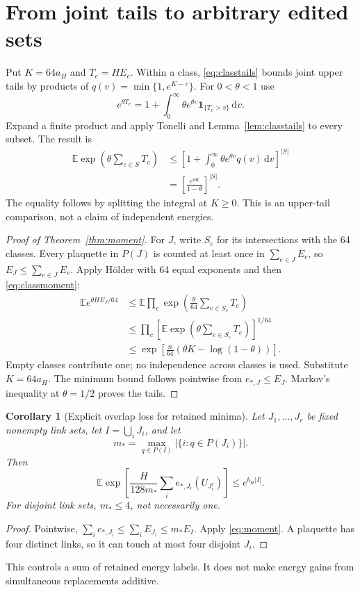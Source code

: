 \documentclass[11pt]{article}
\newtheorem{corollary}[theorem]{Corollary}
\theoremstyle{remark}
\newcommand{\one}{\mathbf 1}
\newcommand{\E}{\mathbb E}
\newcommand{\dd}{\,\mathrm d}
\begin{document}
\section{From joint tails to arbitrary edited sets}
Put $K=64a_H$ and $T_e=HE_e$. Within a class,
\eqref{eq:classtails} bounds joint upper tails by products of
$q(v)=\min\{1,e^{K-v}\}$. For $0<\theta<1$ use
\[
 e^{\theta T_e}=1+\int_0^\infty
                  \theta e^{\theta v}\one_{\{T_e>v\}}\dd v.
\]
Expand a finite product and apply Tonelli and
Lemma~\ref{lem:classtails} to every subset. The result is
\begin{align}
 \E\exp\!\left(\theta\sum_{e\in S}T_e\right)
 &\le\left[1+\int_0^\infty\theta e^{\theta v}q(v)\dd v\right]^{|S|}
   \nonumber\\
 &=\left[\frac{e^{\theta K}}{1-\theta}\right]^{|S|}.
 \label{eq:classmoment}
\end{align}
The equality follows by splitting the integral at $K\ge0$.
This is an upper-tail comparison, not a claim of independent energies.

\begin{proof}[Proof of Theorem~\ref{thm:moment}]
For $J$, write $S_c$ for its intersections with the 64 classes. Every
plaquette in $P(J)$ is counted at least once in $\sum_{e\in J}E_e$, so
$E_J\le\sum_{e\in J}E_e$. Apply H\"older with 64 equal exponents and
then \eqref{eq:classmoment}:
\begin{align*}
 \E e^{\theta HE_J/64}
 &\le \E\prod_c\exp\!\left(\frac\theta{64}
                                      \sum_{e\in S_c}T_e\right)\\
 &\le\prod_c\left[\E\exp\!\left(\theta
                                      \sum_{e\in S_c}T_e\right)\right]^{1/64}\\
 &\le\exp\!\left[\frac n{64}
                   (\theta K-\log(1-\theta))\right].
\end{align*}
Empty classes contribute one; no independence across classes is used.
Substitute $K=64a_H$. The minimum bound follows pointwise from
$e_{*,J}\le E_J$. Markov's inequality at $\theta=1/2$ proves the tails.
\end{proof}

\begin{corollary}[Explicit overlap loss for retained minima]
\label{cor:overlap}
Let $J_1,\ldots,J_r$ be fixed nonempty link sets, let $I=\bigcup_iJ_i$,
and let
\[
 m_* =\max_{q\in P(I)}|\{i:q\in P(J_i)\}|.
\]
Then
\begin{equation}
 \E\exp\!\left[\frac{H}{128m_*}
                  \sum_i e_{*,J_i}(U_{J_i^c})\right]
 \le e^{b_H|I|}.
 \label{eq:overlap}
\end{equation}
For disjoint link sets, $m_*\le4$, not necessarily one.
\end{corollary}
\begin{proof}
Pointwise, $\sum_i e_{*,J_i}\le\sum_i E_{J_i}\le m_*E_I$.
Apply \eqref{eq:moment}. A plaquette has four distinct links, so it
can touch at most four disjoint $J_i$.
\end{proof}
This controls a sum of retained energy labels. It does not make energy
gains from simultaneous replacements additive.
\end{document}
